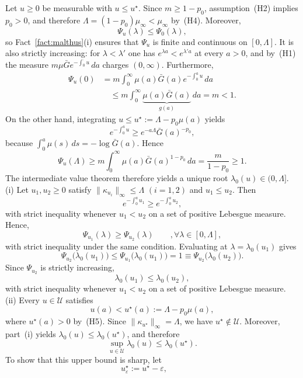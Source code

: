 \documentclass[letterpaper, 10pt, conference]{ieeeconf}
\makeatletter
\newcommand{\calU}{\mathcal{U}}
\newcommand{\Lbar}{\Lambda}
\newcommand{\rev}[1]{#1}
\newcommand{\ed}[1]{#1}
\renewenvironment{proof}[1][\proofname]{\par
  \pushQED{\qed}%
  \normalfont\topsep6\p@\@plus6\p@\relax
  \trivlist
  \item[\hskip\labelsep\itshape #1\@addpunct{.}]\ignorespaces
}{%
  \popQED\endtrivlist\@endpefalse
}
\renewenvironment{proof}[1][\proofname]{\par
  \pushQED{\qed}%
  \normalfont\topsep6\p@\@plus6\p@\relax
  \trivlist
  \item[\hskip\labelsep\itshape #1\@addpunct{.}]\ignorespaces
}{%
  \popQED\endtrivlist\@endpefalse
}
\makeatother
\begin{document}
\begin{proof}
\rev{Let $u\ge0$ be measurable with $u\le u^\star$. Since
$m\ge1-p_0$, assumption~(H2) implies $p_0>0$, and therefore
$\Lbar=(1-p_0)\mu_\infty<\mu_\infty$ by~(H4). Moreover,
\[
\Psi_u(\lambda)
\le
\Psi_0(\lambda),
\]
so Fact~\ref{fact:malthus}(i) ensures that $\Psi_u$ is finite
and continuous on $[0,\Lbar]$. %
It is also strictly increasing:
\ed{for $\lambda<\lambda'$ one has $e^{\lambda a}<e^{\lambda'a}$ at every $a>0$,
and by~(H1) the measure $m\mu\bar Ge^{-\int_0^\cdot u}\,da$ charges
$(0,\infty)$.}
Furthermore,
\begin{align*}
\Psi_u(0)
&=
m\int_0^\infty
\mu(a)\bar G(a)e^{-\int_0^au}\,da \\
&\quad\le
m\int_0^\infty
\underbrace{\mu(a)\bar G(a)}_{g(a)}\,da
=
m<1.
\end{align*}
On the other hand, integrating $u\le u^\star:= \Lbar-p_0\mu(a)$ yields
\[
e^{-\int_0^au}
\ge
e^{-a\Lbar}\bar G(a)^{-p_0},
\]
because $\displaystyle\int_0^a\mu(s)\,ds = -\log\bar G(a)$. 
Hence
\[
\Psi_u(\Lbar)
\ge
m\int_0^\infty
\mu(a)\bar G(a)^{1-p_0}\,da
=
\frac{m}{1-p_0}
\ge1.
\]
The intermediate value theorem therefore yields a unique root
$\lambda_0(u)\in(0,\Lbar]$.}
\\
(i) \rev{Let $u_1,u_2\ge0$ satisfy
$\|\kappa_{u_i}\|_\infty\le\Lbar$ $(i=1,2)$
and
$u_1\le u_2$. Then
\[
e^{-\int_0^a u_1}
\ge
e^{-\int_0^a u_2},
\]
with strict inequality whenever $u_1<u_2$ on a set of positive
Lebesgue measure. Hence,
\[
\Psi_{u_1}(\lambda)\ge\Psi_{u_2}(\lambda)
\qquad, \forall \lambda\in[0,\Lbar],
\]
with strict inequality under the same condition. Evaluating at
$\lambda=\lambda_0(u_1)$ gives
\[
\Psi_{u_2}\!\bigl(\lambda_0(u_1)\bigr)
\le
\Psi_{u_1}\!\bigl(\lambda_0(u_1)\bigr)
= 1 \equiv \Psi_{u_2}\!\bigl(\lambda_0(u_2)\bigr).
\]
Since $\Psi_{u_2}$ is strictly increasing,
\[
\lambda_0(u_1)\le\lambda_0(u_2),
\]
with strict inequality whenever $u_1<u_2$ on a set of positive
Lebesgue measure.}\\
(ii) \rev{Every $u\in\calU$ satisfies
\[
u(a)<u^\star(a):=\Lbar-p_0\mu(a),
\]
where $u^\star(a)>0$ by~{\rm(H5)}. Since $\|\kappa_{u^\star}\|_\infty=\Lbar$, we have $u^\star\notin\calU$. Moreover, part~(i) yields $\lambda_0(u)\le\lambda_0(u^\star)$,
and therefore
\[
\sup_{u\in\calU}\lambda_0(u)
\le
\lambda_0(u^\star).
\]
To show that this upper bound is sharp, let
\[
u^\star_\varepsilon:=u^\star-\varepsilon,
\qquad
\]}
\end{proof}
\end{document}
